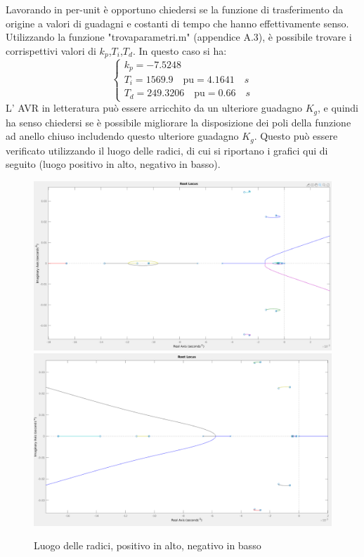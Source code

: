 \documentclass[Lau,noexaminfo]{sapthesis}
\begin{document}
	Lavorando in per-unit è opportuno chiedersi se la funzione di trasferimento da origine a valori di guadagni e costanti di tempo che hanno effettivamente senso. Utilizzando la funzione "trova\textunderscore parametri.m" (appendice A.3), è possibile trovare i corrispettivi valori di $k_p$,$T_i$,$T_d$. In questo caso si ha:\\
	\[
	\begin{cases}
	k_p=-7.5248\\
	T_i=1569.9 \quad\text{pu}=4.1641\quad s\\
	T_d=249.3206\quad \text{pu}=0.66\quad s
	\end{cases}
	\]
	L' AVR in letteratura può essere arricchito da un ulteriore guadagno $K_g$, e quindi ha senso chiedersi se è possibile migliorare la disposizione dei poli della funzione ad anello chiuso includendo questo ulteriore guadagno $K_g$. Questo può essere verificato utilizzando il luogo delle radici, di cui si riportano i grafici qui di seguito (luogo positivo in alto, negativo in basso).
	\begin{figure}
		\centering
	\includegraphics[scale=0.27]{rlocus_P2_pos}
	\includegraphics[scale=0.27]{rlocus_P2_neg}
	\caption{Luogo delle radici, positivo in alto, negativo in basso}
	\end{figure}
\end{document}
